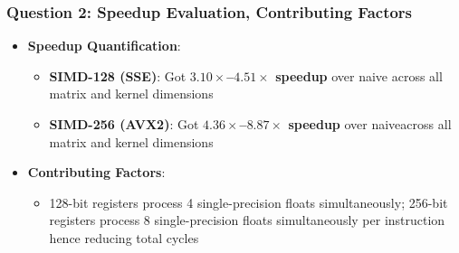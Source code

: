 \documentclass[11pt,a4paper]{article}
\begin{document}
\subsubsection{Question 2: Speedup Evaluation, Contributing Factors}
\begin{itemize}
    \item \textbf{Speedup Quantification}:
    \begin{itemize}
        \item \textbf{SIMD-128 (SSE)}: Got \textbf{$3.10\times$--$4.51\times$ speedup} over naive across all matrix and kernel dimensions
        \item \textbf{SIMD-256 (AVX2)}: Got \textbf{$4.36\times$--$8.87\times$ speedup} over naiveacross all matrix and kernel dimensions
    \end{itemize}
    \item \textbf{Contributing Factors}:
    \begin{itemize}
        \item 128-bit registers process 4 single-precision floats simultaneously; 256-bit registers process 8 single-precision floats simultaneously per instruction hence reducing total cycles
    \end{itemize}
\end{itemize}
\end{document}
